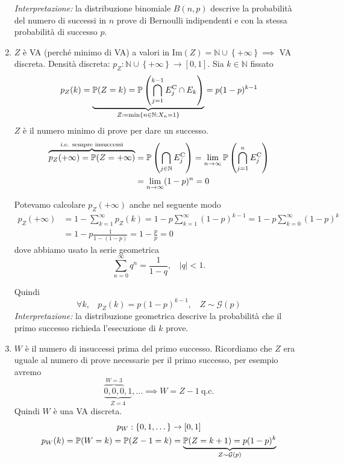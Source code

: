\begin{enumerate}
\textit{Interpretazione:} la distribuzione binomiale $B\left( n,p\right)$ descrive la probabilità del numero di successi in $n$ prove di Bernoulli indipendenti e con la stessa probabilità di successo $p$.
\item $Z$ è VA (perché minimo di VA) a valori in $\mathrm{Im}\left( Z\right) =\mathbb{N} \cup \left\{+\infty \right\} \implies $ VA discreta. Densità discreta: $p_{Z} :\mathbb{N} \cup \left\{+\infty \right\}\rightarrow \left[ 0,1\right]$. Sia $k\in \mathbb{N}$ fissato
\begin{equation*}
p_{Z}( k) =\underbrace{\mathbb{P}( Z=k) =\mathbb{P}\left(\bigcap\limits _{j=1}^{k-1} E_{j}^{\mathrm{C}} \cap E_{k}\right)}_{Z\coloneqq \min\{n\in \mathbb{N} :X_{n} =1\}} =p( 1-p)^{k-1}
\end{equation*}
$Z$ è il numero minimo di prove per dare un successo.
\begin{align*}
\overbrace{p_{Z}( +\infty ) =\mathbb{P}( Z=+\infty )}^{\text{i.e. sempre insuccessi}} & =\mathbb{P}\left(\bigcap _{j\in \mathbb{N}} E_{j}^{\mathrm{C}}\right) =\lim _{n\rightarrow \infty }\mathbb{P}\left(\bigcap _{j=1}^{n} E_{j}^{\mathrm{C}}\right)\\
 & =\lim _{n\rightarrow \infty }( 1-p)^{n} =0
\end{align*}

\begin{oss}
Potevamo calcolare $p_{Z}( +\infty )$ anche nel seguente modo
\begin{align*}
p_{Z}( +\infty ) & =1-\sum\limits _{k=1}^{\infty } p_{Z}( k) =1-p\sum\limits _{k=1}^{\infty }( 1-p)^{k-1} =1-p\sum\limits _{k=0}^{\infty }( 1-p)^{k}\\
 & =1-p\frac{1}{1-( 1-p)} =1-\frac{p}{p} =0
\end{align*}
dove abbiamo usato la serie geometrica
\begin{equation*}
\sum\limits _{n=0}^{\infty } q^{n} =\frac{1}{1-q} ,\ \ \ \ | q| < 1.
\end{equation*}
\end{oss}

Quindi
\begin{equation*}
\forall k,\ \ \ \ p_{Z}( k) =p( 1-p)^{k-1} ,\ \ \ \ \boxed{Z\sim \mathcal{G}( p)}
\end{equation*}
\textit{Interpretazione:} la distribuzione geometrica descrive la probabilità che il primo successo richieda l'esecuzione di $k$ prove.
\item $W$ è il numero di insuccessi prima del primo successo. Ricordiamo che $Z$ era uguale al numero di prove necessarie per il primo successo, per esempio avremo
\begin{equation*}
\underbrace{\overbrace{0,0,0}^{W=3} ,1}_{Z=4} ,\dots \implies W=Z-1\ \text{q.c.}
\end{equation*}
Quindi $W$ è una VA discreta.
\begin{gather*}
p_{W} :\{0,1,\dots \}\rightarrow [ 0,1]\\
p_{W}( k) =\mathbb{P}( W=k) =\mathbb{P}( Z-1=k) =\underbrace{\mathbb{P}( Z=k+1) =p( 1-p)^{k}}_{Z\sim \mathcal{G}( p)}
\end{gather*}


\end{enumerate}
